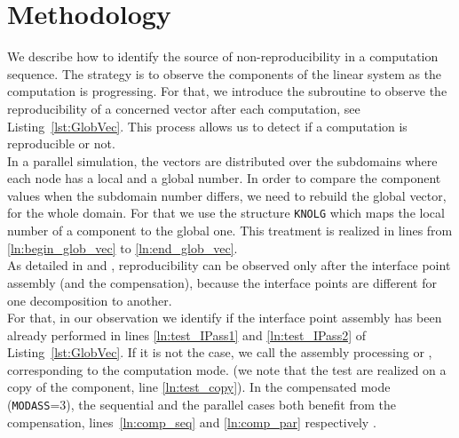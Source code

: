 \section{Methodology}
\label{sec:methodology}
%
We describe how to identify the source of
non-reproducibility in a computation sequence.
The strategy is to observe the components
of the linear system as the computation is progressing.
For that, we introduce the subroutine 
to observe the reproducibility of a concerned vector after each computation,
see Listing~\ref{lst:GlobVec}.
This process allows us to detect if a computation is reproducible or not.\\
%
In a parallel simulation, the vectors are distributed over the subdomains where each
node has a local and a global number.
In order to compare the component values when the subdomain number differs,
we need to rebuild the global vector, \ie for the whole domain.
For that we use the structure \texttt{KNOLG} which maps the local number of a component
to the global one.
This treatment is realized in
lines from \ref{ln:begin_glob_vec} to \ref{ln:end_glob_vec}.\\
%
As detailed in \cite{LaND15} and \cite{LaND16}, reproducibility can be observed
only after the interface point assembly (and the compensation), because
the interface points are different for one
decomposition to another.\\
For that, in our observation we identify if the interface point assembly
has been already performed in lines \ref{ln:test_IPass1} and \ref{ln:test_IPass2}
of Listing~\ref{lst:GlobVec}. If it is not the case, we call the assembly
processing  or , corresponding to the
computation mode.
(we note that the test are realized on a copy of the component, line \ref{ln:test_copy}).
In the compensated mode (\texttt{MODASS}=3), the sequential and
the parallel cases both benefit from the compensation, lines~\ref{ln:comp_seq} and \ref{ln:comp_par} respectively .

